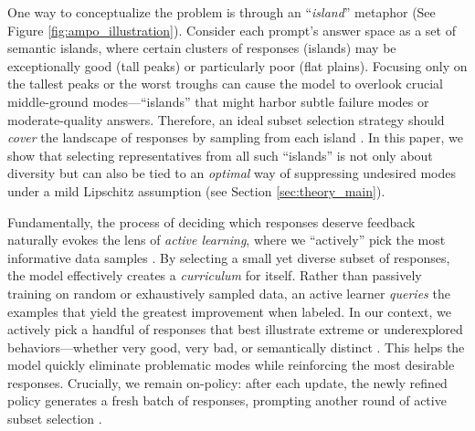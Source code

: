 One way to conceptualize the problem is through an “\textit{island}” metaphor (See Figure \ref{fig:ampo_illustration}). Consider each prompt’s answer space as a set of semantic islands, where certain clusters of responses (islands) may be exceptionally good (tall peaks) or particularly poor (flat plains). Focusing only on the tallest peaks or the worst troughs can cause the model to overlook crucial middle-ground modes—“islands” that might harbor subtle failure modes or moderate-quality answers. Therefore, an ideal subset selection strategy should \emph{cover} the landscape of responses by sampling from each island \citep{yu2024large}. In this paper, we show that selecting representatives from all such “islands” is not only about diversity but can also be tied to an \emph{optimal} way of suppressing undesired modes under a mild Lipschitz assumption (see Section \ref{sec:theory_main}).

\vspace{-0.05in}
Fundamentally, the process of deciding which responses deserve feedback naturally evokes the lens of \emph{active learning}, where we “actively” pick the most informative data samples
\citep{cohn1996active, ceravolo2024active, xiao2023freeal}. By selecting a small yet diverse subset of responses, the model effectively creates a \emph{curriculum} for itself. Rather than passively training on random or exhaustively sampled data, an active learner \emph{queries} the examples that yield the greatest improvement when labeled. In our context, we actively pick a handful of responses that best illustrate extreme or underexplored behaviors—whether very good, very bad, or semantically distinct \citep{wu2023fine}. This helps the model quickly eliminate problematic modes while reinforcing the most desirable responses. Crucially, we remain on-policy: after each update, the newly refined policy generates a fresh batch of responses, prompting another round of active subset selection \citep{liu2021self}.

